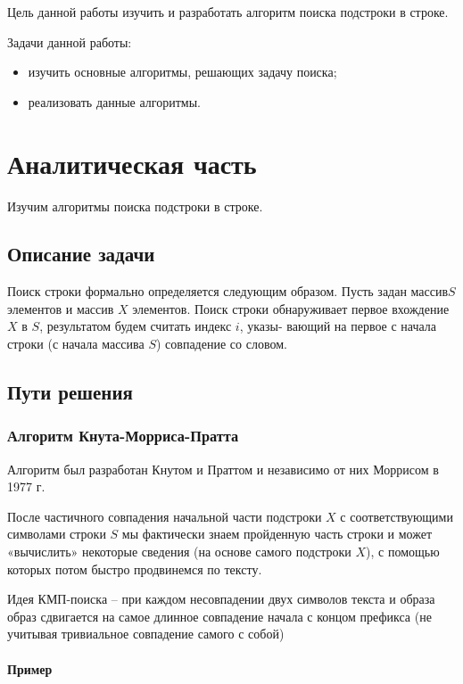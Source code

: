 \documentclass[a4paper,12pt]{article}
\begin{document}
Цель данной работы изучить и разработать алгоритм поиска
подстроки в строке.

Задачи данной работы:

\begin{itemize}
    \item изучить основные алгоритмы, решающих задачу поиска;
    \item реализовать данные алгоритмы.
\end{itemize}

\newpage
\section{Аналитическая часть}

Изучим алгоритмы поиска подстроки в строке.

\subsection{Описание задачи}

Поиск строки формально определяется следующим образом. Пусть задан массив$S$ элементов и массив $X$ элементов. Поиск строки обнаруживает первое вхождение $X$ в $S$, результатом будем считать индекс $i$, указы- вающий на первое с начала строки (с начала массива $S$) совпадение со словом.

\subsection{Пути решения}

\subsubsection{Алгоритм Кнута-Морриса-Пратта}

Алгоритм был разработан Кнутом и Праттом и независимо от них
Моррисом в 1977 г.

После частичного совпадения начальной части подстроки $X$ с
соответствующими символами строки $S$ мы фактически знаем
пройденную часть строки и может «вычислить» некоторые сведения
(на основе самого подстроки $X$), с помощью которых потом быстро
продвинемся по тексту.

Идея КМП-поиска -- при каждом несовпадении двух символов текста и
образа образ сдвигается на самое длинное совпадение начала с концом
префикса (не учитывая тривиальное совпадение самого с собой)

\paragraph{Пример}
\end{document}
